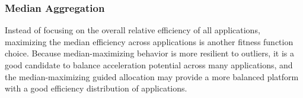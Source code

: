 \subsubsection{Median Aggregation}

Instead of focusing on the overall relative efficiency of all applications, maximizing the median efficiency across applications is another fitness function choice. 
Because median-maximizing behavior is more resilient to outliers, it is a good candidate to balance acceleration potential across many applications, and the median-maximizing guided allocation may provide a more balanced platform with a good efficiency distribution of applications. 

